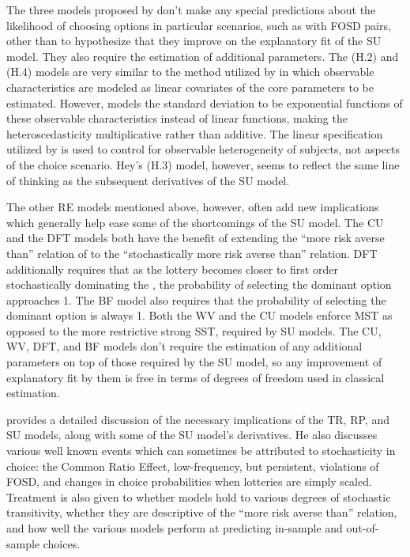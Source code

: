 \documentclass[../main.tex]{subfiles}
\begin{document}
The three models proposed by \textcite{Hey1995} don't make any special predictions about the likelihood of choosing options in particular scenarios, such as with FOSD pairs, other than to hypothesize that they improve on the explanatory fit of the SU model.
They also require the estimation of additional parameters.
The (H.2) and (H.4) models are very similar to the method utilized by \textcite[142]{Harrison2008a} in which observable characteristics are modeled as linear covariates of the core parameters to be estimated.
However, \textcite{Hey1995} models the standard deviation to be exponential functions of these observable characteristics instead of linear functions, making the heteroscedasticity multiplicative rather than additive.
The linear specification utilized by \textcite{Harrison2008a} is used to control for observable heterogeneity of subjects, not aspects of the choice scenario.
Hey's (H.3) model, however, seems to reflect the same line of thinking as the subsequent derivatives of the SU model.

The other RE models mentioned above, however, often add new implications which generally help ease some of the shortcomings of the SU model.
The CU and the DFT models both have the benefit of extending the \enquote{more risk averse than} relation of \textcite{Pratt1964} to the \enquote{stochastically more risk averse than} relation.
DFT additionally requires that as the lottery becomes closer to first order stochastically dominating the {\CE}, the probability of selecting the dominant option approaches 1.
The BF model also requires that the probability of selecting the dominant option is always 1.
Both the WV and the CU models enforce MST as opposed to the more restrictive strong SST,  required by SU models.
The CU, WV, DFT, and BF models don't require the estimation of any additional parameters on top of those required by the SU model, so any improvement of explanatory fit by them is free in terms of degrees of freedom used in classical estimation.

\textcite{Wilcox2008} provides a detailed discussion of the necessary implications of the TR, RP,  and SU models, along with some of the SU model's derivatives.
He also discusses various well known events which can sometimes be attributed to stochasticity in choice: the Common Ratio Effect, low-frequency, but persistent, violations of FOSD, and changes in choice probabilities when lotteries are simply scaled.{\footnotemark}
Treatment is also given to whether models hold to various degrees of stochastic transitivity, whether they are descriptive of the \enquote{more risk averse than} relation, and how well the various models perform at predicting in-sample and out-of-sample choices.{\footnotemark}
\end{document}
